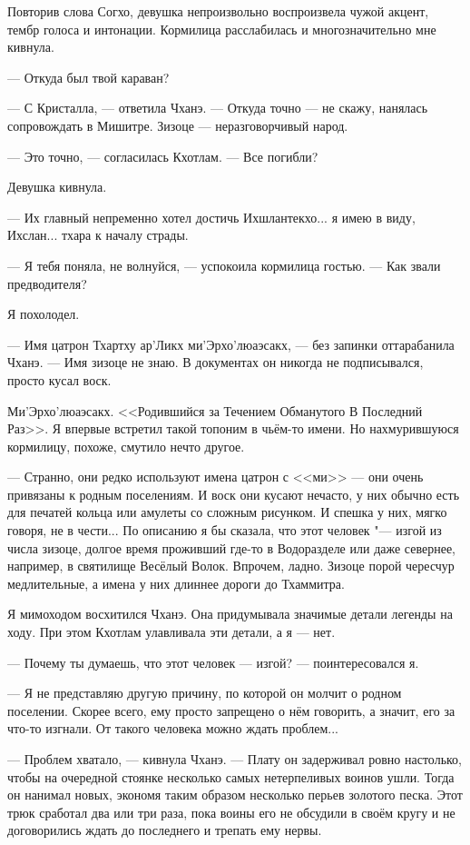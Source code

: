 Повторив слова Согхо, девушка непроизвольно воспроизвела чужой акцент, тембр голоса и интонации.
Кормилица расслабилась и многозначительно мне кивнула.

--- Откуда был твой караван?

--- С Кристалла, --- ответила Чханэ.
--- Откуда точно --- не скажу, нанялась сопровождать в Мишитре.
Зизоце --- неразговорчивый народ.

--- Это точно, --- согласилась Кхотлам.
--- Все погибли?

Девушка кивнула.

--- Их главный непременно хотел достичь Ихшлантекхо... я имею в виду, Ихслан... тхара к началу страды.

--- Я тебя поняла, не волнуйся, --- успокоила кормилица гостью. --- Как звали предводителя?

Я похолодел.

--- Имя цатрон Тхартху ар'Ликх ми'Эрхо'люаэсакх, --- без запинки оттарабанила Чханэ.
--- Имя зизоце не знаю.
В документах он никогда не подписывался, просто кусал воск.

Ми'Эрхо'люаэсакх.
<<Родившийся за Течением Обманутого В Последний Раз>>.
Я впервые встретил такой топоним в чьём-то имени.
Но нахмурившуюся кормилицу, похоже, смутило нечто другое.

--- Странно, они редко используют имена цатрон с <<ми>> --- они очень привязаны к родным поселениям.
И воск они кусают нечасто, у них обычно есть для печатей кольца или амулеты со сложным рисунком.
И спешка у них, мягко говоря, не в чести...
По описанию я бы сказала, что этот человек "--- изгой из числа зизоце, долгое время проживший где-то в Водоразделе или даже севернее, например, в святилище Весёлый Волок.
Впрочем, ладно.
Зизоце порой чересчур медлительные, а имена у них длиннее дороги до Тхаммитра.

Я мимоходом восхитился Чханэ.
Она придумывала значимые детали легенды на ходу.
При этом Кхотлам улавливала эти детали, а я --- нет.

--- Почему ты думаешь, что этот человек --- изгой? --- поинтересовался я.

--- Я не представляю другую причину, по которой он молчит о родном поселении.
Скорее всего, ему просто запрещено о нём говорить, а значит, его за что-то изгнали.
От такого человека можно ждать проблем...

--- Проблем хватало, --- кивнула Чханэ.
--- Плату он задерживал ровно настолько, чтобы на очередной стоянке несколько самых нетерпеливых воинов ушли.
Тогда он нанимал новых, экономя таким образом несколько перьев золотого песка.
Этот трюк сработал два или три раза, пока воины его не обсудили в своём кругу и не договорились ждать до последнего и трепать ему нервы.

